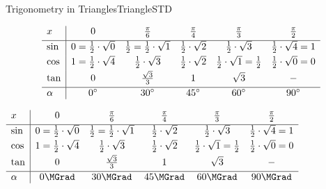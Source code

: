 \begin{MXContent}{Trigonometry in Triangles}{Triangle}{STD}
\ifttm
\begin{MDirectHTML}
\[
\begin{array}[t]{l|*{5}{c}}
 x            & 0                          & \tfrac{\pi}{6}             & \tfrac{\pi}{4}             & \tfrac{\pi}{3}             & \tfrac{\pi}{2}             \\[1mm] \hline
         \sin & 0 = \frac{1}{2} \cdot \sqrt{0} & \frac{1}{2} = \frac{1}{2} \cdot \sqrt{1} & \frac{1}{2} \cdot \sqrt{2} & \frac{1}{2} \cdot \sqrt{3} & \frac{1}{2} \cdot \sqrt{4} = 1 \\[1mm]
         \cos & 1 = \frac{1}{2} \cdot \sqrt{4} & \frac{1}{2} \cdot \sqrt{3} & \frac{1}{2} \cdot \sqrt{2} & \frac{1}{2} \cdot \sqrt{1} = \frac{1}{2} & \frac{1}{2} \cdot \sqrt{0} = 0 \\[1mm]
         \tan & 0                          & \frac{\sqrt{3}}{3}         & 1                          & \sqrt{3}                   & -                          \\[1mm] \hline
 \alpha       & 0^{\circ}                    & 30^{\circ}                   & 45^{\circ}                   & 60^{\circ}                   & 90^{\circ} %
\end{array}
\]
\end{MDirectHTML}
\else
\begin{center}
       $\begin{array}[t]{l|*{5}{c}}
 x            & 0                          & \Mtfrac{\pi}{6}             & \Mtfrac{\pi}{4}             & \Mtfrac{\pi}{3}             & \Mtfrac{\pi}{2}         \\[1mm] \hline
         \sin & 0 = \frac{1}{2} \cdot \sqrt{0} & \frac{1}{2} = \frac{1}{2} \cdot \sqrt{1} & \frac{1}{2} \cdot \sqrt{2} & \frac{1}{2} \cdot \sqrt{3} & \frac{1}{2} \cdot \sqrt{4} = 1 \\[1mm]
         \cos & 1 = \frac{1}{2} \cdot \sqrt{4} & \frac{1}{2} \cdot \sqrt{3} & \frac{1}{2} \cdot \sqrt{2} & \frac{1}{2} \cdot \sqrt{1} = \frac{1}{2} & \frac{1}{2} \cdot \sqrt{0} = 0 \\[1mm]
         \tan & 0                          & \frac{\sqrt{3}}{3}         & 1                          & \sqrt{3}                   & -                          \\[1mm] \hline
 \alpha       & 0\MGrad                  & 30\MGrad                 & 45\MGrad                 & 60\MGrad                 & 90\MGrad %
        \end{array}$
\end{center}
\fi


\end{MXContent}
